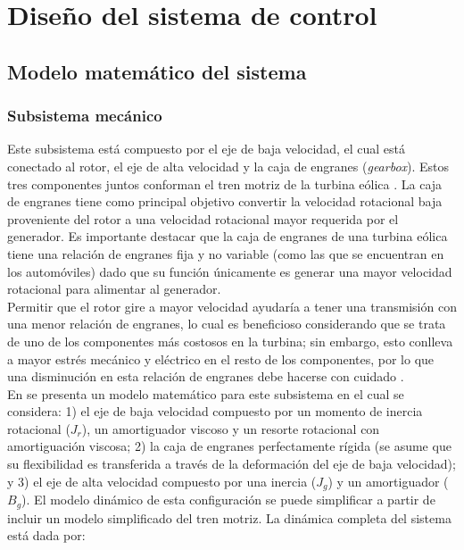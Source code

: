 \chapter{Diseño del sistema de control}

\section{Modelo matemático del sistema}

\subsection{Subsistema mecánico}

{\parindent0pt
Este subsistema está compuesto por el eje de baja velocidad, el cual está conectado al rotor, el eje de alta velocidad 
y la caja de engranes (\emph{gearbox}). Estos tres componentes juntos conforman el tren motriz de la turbina eólica 
\cite{soltani2013}. La caja de engranes tiene como principal objetivo convertir la velocidad rotacional baja proveniente 
del rotor a una velocidad rotacional mayor requerida por el generador. Es importante destacar que la caja de engranes 
de una turbina eólica tiene una relación de engranes fija y no variable (como las que se encuentran en los automóviles) 
dado que su función únicamente es generar una mayor velocidad rotacional para alimentar al generador.
\\

Permitir que el rotor gire a mayor velocidad ayudaría a tener una transmisión con una menor relación de engranes, 
lo cual es beneficioso considerando que se trata de uno de los componentes más costosos en la turbina; sin embargo, 
esto conlleva a mayor estrés mecánico y eléctrico en el resto de los componentes, por lo que una disminución en esta 
relación de engranes debe hacerse con cuidado \cite{Burton2011}.
\\

En \cite{soltani2013} se presenta un modelo matemático para este subsistema en el cual se considera: 1) el eje de baja 
velocidad compuesto por un momento de inercia rotacional ($J_r$), un amortiguador viscoso y un resorte rotacional con 
amortiguación viscosa; 2) la caja de engranes perfectamente rígida (se asume que su flexibilidad es transferida a través 
de la deformación del eje de baja velocidad); y 3) el eje de alta velocidad compuesto por una inercia ($J_g$) y un amortiguador ($B_g$).
El modelo dinámico de esta configuración se puede simplificar a partir de incluir un modelo simplificado del tren 
motriz. La dinámica completa del sistema está dada por:

}
